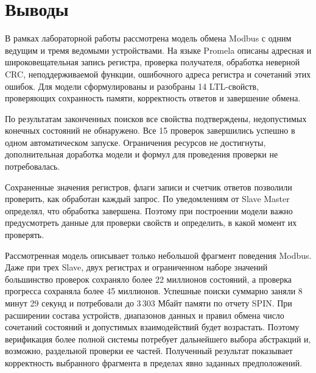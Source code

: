 \section{Выводы}

В рамках лабораторной работы рассмотрена модель обмена Modbus с одним
ведущим и тремя ведомыми устройствами. На языке Promela описаны
адресная и широковещательная запись регистра, проверка получателя,
обработка неверной CRC, неподдерживаемой функции, ошибочного адреса
регистра и сочетаний этих ошибок. Для модели сформулированы и разобраны 14 LTL-свойств,
проверяющих сохранность памяти, корректность ответов и завершение обмена.

По результатам законченных поисков все свойства подтверждены,
недопустимых конечных состояний не обнаружено. Все 15 проверок завершились
успешно в одном автоматическом запуске. Ограничения ресурсов не достигнуты,
дополнительная доработка модели и формул для проведения проверки
не потребовалась.

Сохраненные значения регистров, флаги записи и счетчик ответов позволили
проверить, как обработан каждый запрос. По уведомлениям от Slave
Master определял, что обработка завершена. Поэтому при построении модели
важно предусмотреть данные для проверки свойств и определить,
в какой момент их проверять.

Рассмотренная модель описывает только небольшой фрагмент поведения
Modbus. Даже при трех Slave, двух регистрах и ограниченном наборе
значений большинство проверок сохраняло более 22 миллионов состояний,
а проверка прогресса сохраняла более 45 миллионов. Успешные поиски суммарно
заняли 8 минут 29 секунд и потребовали до 3\,303 Мбайт памяти по отчету SPIN.
При расширении состава устройств, диапазонов данных и правил обмена
число сочетаний состояний и допустимых взаимодействий будет возрастать.
Поэтому верификация более полной системы потребует дальнейшего выбора
абстракций и, возможно, раздельной проверки ее частей. Полученный
результат показывает корректность выбранного фрагмента в пределах
явно заданных предположений.
